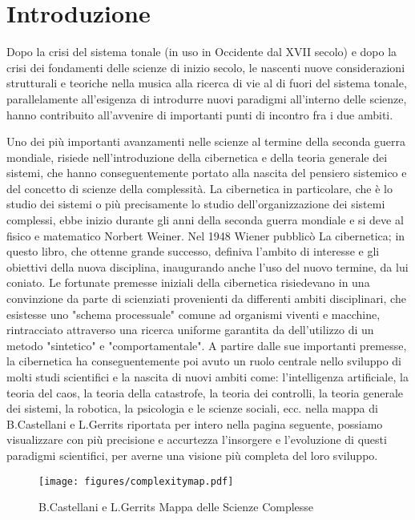 \section{Introduzione}
\label{sec:Introduzione}

Dopo la crisi del sistema tonale (in uso in Occidente dal XVII secolo)
e dopo la crisi dei fondamenti delle scienze di inizio secolo,
le nascenti nuove considerazioni strutturali e teoriche
nella musica alla ricerca di vie al di fuori del sistema tonale,
parallelamente all'esigenza di introdurre nuovi paradigmi all'interno delle scienze,
hanno contribuito all'avvenire di importanti punti di incontro fra i due ambiti.

Uno dei più importanti avanzamenti nelle scienze
al termine della seconda guerra mondiale,
risiede nell'introduzione della
cibernetica e della teoria generale dei sistemi, che hanno conseguentemente
portato alla nascita del pensiero sistemico e del concetto di scienze della complessità.
La cibernetica in particolare, che è lo studio dei sistemi o più precisamente lo studio
dell'organizzazione dei sistemi complessi, ebbe inizio durante gli anni della seconda guerra mondiale
e si deve al fisico e matematico Norbert Weiner.
Nel 1948 Wiener pubblicò La cibernetica; in questo libro, che ottenne grande successo,
definiva l'ambito di interesse e gli obiettivi della nuova disciplina,
inaugurando anche l'uso del nuovo termine, da lui coniato.
Le fortunate premesse iniziali della cibernetica risiedevano in una convinzione
da parte di scienziati provenienti da differenti ambiti disciplinari, che esistesse uno
"schema processuale" comune ad organismi viventi e macchine, rintracciato attraverso una ricerca
uniforme garantita da dell'utilizzo di un metodo "sintetico" e "comportamentale".
A partire dalle sue importanti premesse,
la cibernetica ha conseguentemente poi avuto un ruolo centrale nello sviluppo di
molti studi scientifici e la nascita
di nuovi ambiti come: l'intelligenza artificiale, la teoria del caos,
la teoria della catastrofe,
la teoria dei controlli, la teoria generale dei sistemi, la robotica,
la psicologia e le scienze sociali,
ecc.
nella mappa di B.Castellani e L.Gerrits riportata per intero nella pagina seguente,
possiamo visualizzare con più precisione e accurtezza
l'insorgere e l'evoluzione di questi paradigmi scientifici, per averne una
visione più completa del loro sviluppo.

\clearpage

\begin{figure}[!h]
    \centering
    \texttt{[image: figures/complexitymap.pdf]}
    \caption{B.Castellani e L.Gerrits Mappa delle Scienze Complesse}
    \label{fig:figure}
\end{figure}


